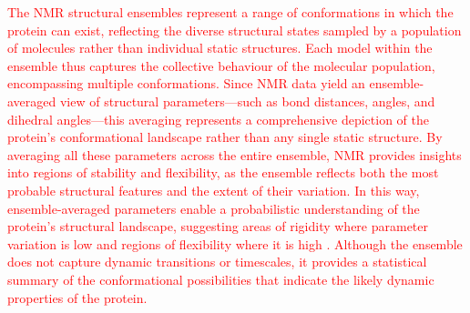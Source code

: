\textcolor{red}{The NMR structural ensembles represent a range of conformations in which the protein can exist, reflecting the diverse structural states sampled by a population of molecules rather than individual static structures. Each model within the ensemble thus captures the collective behaviour of the molecular population, encompassing multiple conformations. Since NMR data yield an ensemble-averaged view of structural parameters—such as bond distances, angles, and dihedral angles—this averaging represents a comprehensive depiction of the protein’s conformational landscape rather than any single static structure. By averaging all these parameters across the entire ensemble, NMR provides insights into regions of stability and flexibility, as the ensemble reflects both the most probable structural features and the extent of their variation. In this way, ensemble-averaged parameters enable a probabilistic understanding of the protein’s structural landscape, suggesting areas of rigidity where parameter variation is low and regions of flexibility where it is high \cite{sutcliffe_representing_1993, stockelmaier_conformational_2024}. Although the ensemble does not capture dynamic transitions or timescales, it provides a statistical summary of the conformational possibilities that indicate the likely dynamic properties of the protein.}







